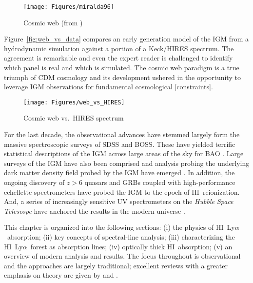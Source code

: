 \documentclass[graybox]{svmult}
\newcommand{\HI}{H{\sc I}}
\def\lya{Ly$\alpha$}
\begin{document}
%
\begin{figure}[b]
\sidecaption
\texttt{[image: Figures/miralda96]}
%
%
\caption{Cosmic web (from \cite{miralda96})
}
\label{fig:web}       %
\end{figure}


Figure~\ref{fig:web_vs_data} compares an early generation
model of the IGM from a hydrodynamic simulation 
against a portion of a Keck/HIRES spectrum.  The
agreement is remarkable and even the expert reader
is challenged to identify which panel is real and
which is simulated.
The cosmic web paradigm is a true triumph of CDM
cosmology and its development ushered in the 
opportunity to leverage IGM observations for fundamental
cosmological [constraints].

%
\begin{figure}[b]
\sidecaption
\texttt{[image: Figures/web\_vs\_HIRES]}
%
%
\caption{Cosmic web vs.\ HIRES spectrum
}
\label{fig:web_vs_HIRES}       %
\end{figure}


For the last decade, the observational advances
have stemmed largely form the massive spectroscopic
surveys of SDSS and BOSS.
These have yielded terrific statistical descriptions
of the IGM \cite{PDF} 
across large areas of the sky for BAO \cite{IGM_BAO}.
Large surveys of the IGM have also been comprised
\cite{phw05,pow10,noterdaeme} and
analysis probing the underlying dark matter density
field probed by the IGM have emerged \cite{font}.
In addition, the ongoing discovery of $z>6$ quasars 
and GRBs coupled with high-performance echellette
spectrometers have probed the IGM to the epoch
of \HI\ reionization.  And, a series of increasingly
sensitive UV spectrometers on the
{\it Hubble Space Telescope}
have anchored the results in the modern universe
\cite{penton,tripp,xx}.

This chapter is organized into the following sections:
 (i) the physics of \HI\ \lya\ absorption;
 (ii) key concepts of spectral-line analysis;
 (iii) characterizing the \HI\ \lya\ forest as absorption lines;
 (iv) optically thick \HI\ absorption;
 (v) an overview of modern analysis and results.
The focus throughout is observational and the approaches
are largely traditional;  excellent reviews with a greater
emphasis on theory are given by \cite{meiksin0X} and
\cite{mcquinn1X}.  
\end{document}
